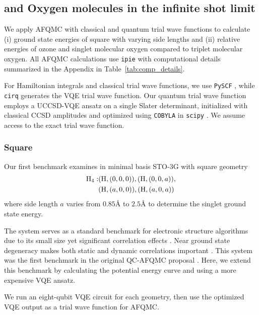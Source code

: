 \documentclass[../main.tex]{subfiles}
\begin{document}
\subsection{ and Oxygen molecules in the infinite shot limit}

We apply AFQMC with classical and quantum trial wave functions to calculate (i) ground state energies of square  with varying side lengths and (ii) relative energies of ozone and singlet molecular oxygen compared to triplet molecular oxygen. All AFQMC calculations use \texttt{ipie} \cite{malone2022a} with computational details summarized in the Appendix in Table~\ref{tab:comp_details}. 

For Hamiltonian integrals and classical trial wave functions, we use  \texttt{PySCF} \cite{sun2018pyscf}, while \texttt{cirq} \cite{cirq_developers_2022_7465577} generates the VQE trial wave function. Our quantum trial wave function employs a UCCSD-VQE ansatz on a single Slater determinant, initialized with classical CCSD amplitudes  \cite{romero2018strategies} and optimized using \texttt{COBYLA} in \texttt{scipy} \cite{2020SciPy-NMeth}.  We assume access to the exact trial wave function.

\subsubsection{ Square}

Our first benchmark examines  in minimal basis STO-3G with square geometry
\begin{align*}
    \ce{H4} :&(\ce{H}, (0, 0, 0)), (\ce{H}, (0, 0, a)),\\ &(\ce{H}, (a, 0, 0)), (\ce{H}, (a, 0, a))\,
\end{align*}
where side length $a$ varies from $0.85\text{\AA}$ to $2.5\text{\AA}$ to determine the singlet ground state energy.

The  system serves as a standard benchmark for electronic structure algorithms due to its small size yet significant correlation effects \cite{Anderson1979H4,Gasperich2017dqmcH4,huggins2022unbiasing, baek2022say,lee2022twenty}. Near ground state degeneracy makes both static and dynamic correlations important  \cite{Gasperich2017dqmcH4,Genovese2019dqmcH4}. This system was the first benchmark in the original QC-AFQMC proposal  \cite{huggins2022unbiasing}. Here, we extend this benchmark by calculating the potential energy curve and using a more expensive VQE ansatz. 

We run an eight-qubit VQE circuit for each geometry, then use the optimized VQE output as a trial wave function for AFQMC.
\end{document}
